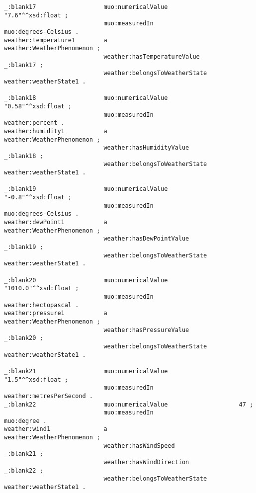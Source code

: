 \begin{lstlisting}
_:blank17                   muo:numericalValue                    "7.6"^^xsd:float ;
                            muo:measuredIn                        muo:degrees-Celsius .
weather:temperature1        a                                     weather:WeatherPhenomenon ;
                            weather:hasTemperatureValue           _:blank17 ;
                            weather:belongsToWeatherState         weather:weatherState1 .

_:blank18                   muo:numericalValue                    "0.58"^^xsd:float ;
                            muo:measuredIn                        weather:percent .
weather:humidity1           a                                     weather:WeatherPhenomenon ;
                            weather:hasHumidityValue              _:blank18 ;
                            weather:belongsToWeatherState         weather:weatherState1 .

_:blank19                   muo:numericalValue                    "-0.8"^^xsd:float ;
                            muo:measuredIn                        muo:degrees-Celsius .
weather:dewPoint1           a                                     weather:WeatherPhenomenon ;
                            weather:hasDewPointValue              _:blank19 ;
                            weather:belongsToWeatherState         weather:weatherState1 .

_:blank20                   muo:numericalValue                    "1010.0"^^xsd:float ;
                            muo:measuredIn                        weather:hectopascal .
weather:pressure1           a                                     weather:WeatherPhenomenon ;
                            weather:hasPressureValue              _:blank20 ;
                            weather:belongsToWeatherState         weather:weatherState1 .

_:blank21                   muo:numericalValue                    "1.5"^^xsd:float ;
                            muo:measuredIn                        weather:metresPerSecond .
_:blank22                   muo:numericalValue                    47 ;
                            muo:measuredIn                        muo:degree .
weather:wind1               a                                     weather:WeatherPhenomenon ;
                            weather:hasWindSpeed                  _:blank21 ;
                            weather:hasWindDirection              _:blank22 ;
                            weather:belongsToWeatherState         weather:weatherState1 .


\end{lstlisting}
